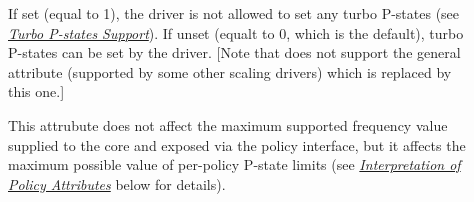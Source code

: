 \documentclass[a4paper,8pt,english]{sphinxmanual}
\begin{document}
\label{admin-guide/pm/intel_pstate:no-turbo-attr}\begin{description}
\item[{}] \leavevmode
If set (equal to 1), the driver is not allowed to set any turbo P-states
(see {\hyperref[admin\string-guide/pm/intel_pstate:turbo\string-p\string-states\string-support]{\emph{Turbo P-states Support}}}).  If unset (equalt to 0, which is the
default), turbo P-states can be set by the driver.
{[}Note that  does not support the general 
attribute (supported by some other scaling drivers) which is replaced
by this one.{]}

This attrubute does not affect the maximum supported frequency value
supplied to the  core and exposed via the policy interface,
but it affects the maximum possible value of per-policy P-state limits
(see {\hyperref[admin\string-guide/pm/intel_pstate:interpretation\string-of\string-policy\string-attributes]{\emph{Interpretation of Policy Attributes}}} below for details).

\end{description}
\end{document}
